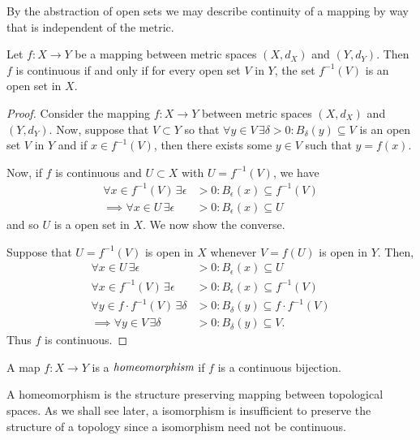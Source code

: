 By the abstraction of open sets we may describe continuity of a mapping by
way that is independent of the metric.

\begin{thm}
	Let $f:X \to Y$ be a mapping between metric spaces $(X,d_{X})$ and
	$(Y,d_{Y})$. Then $f$ is continuous if and only if for every open
	set $V$ in $Y$, the set $f^{-1}(V)$ is an open set in $X$.
\end{thm}

\begin{proof}
	Consider the mapping $f:X \to Y$ between metric spaces $(X,d_{X})$
	and $(Y,d_{Y})$. Now, suppose that $V \subset Y$ so that
	$\forall y \in V \, \exists \delta >0 : B_{\delta}(y) \subseteq V$
	is an open set $V$ in $Y$ and if $x \in f^{-1}(V)$, then there exists
	some $y \in V$ such that $y=f(x)$.
	
	Now, if $f$ is continuous and $U \subset X$ with $U=f^{-1}(V)$, we have
	\begin{align*}
		\forall x \in f^{-1}(V) \, \exists \epsilon & >0 : B_{\epsilon}(x) \subseteq f^{-1}(V)
		\\ \implies
		\forall x \in U \, \exists \epsilon & >0 : B_{\epsilon}(x) \subseteq U
	\end{align*}
	and so $U$ is a open set in $X$. We now show the converse.

	Suppose that $U=f^{-1}(V)$ is open in $X$ whenever $V=f(U)$ is open in $Y$. Then,
	\begin{align*}
		\forall x \in U \, \exists \epsilon & >0 : B_{\epsilon}(x) \subseteq U
		\\
		\forall x \in f^{-1}(V) \, \exists \epsilon & >0 : B_{\epsilon}(x) \subseteq f^{-1}(V)
		\\
		\forall y \in f \cdot f^{-1}(V) \, \exists \delta & >0 :
		B_{\delta}(y) \subseteq f \cdot f^{-1}(V)
		\\ \implies
		\forall y \in V \, \exists \delta & >0 : B_{\delta}(y) \subseteq V.
	\end{align*}
	Thus $f$ is continuous.
\end{proof}

\begin{defn}[Homeomorphism]
	A map $f: X \to Y$ is a $\emph{homeomorphism}$ if $f$ is a continuous bijection.
\end{defn}

\begin{rem}
	A homeomorphism is the structure preserving mapping between topological spaces.
	As we shall see later, a isomorphism is insufficient to preserve the structure
	of a topology since a isomorphism need not be continuous.
\end{rem}

